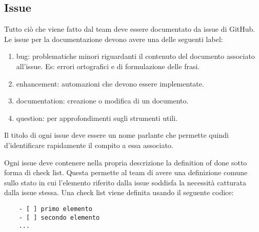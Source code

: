 \documentclass[a4paper, 12pt]{article}
\begin{document}
\subsection{Issue}
\label{subsec:issue}
Tutto ciò che viene fatto dal team deve essere documentato da issue di GitHub.
Le issue per la documentazione devono avere una delle seguenti label:
\begin{enumerate}
    \item bug: problematiche minori riguardanti il contenuto del documento associato all'issue.
    Es: errori ortografici e di formulazione delle frasi.

    \item enhancement: automazioni che devono essere implementate.
    
    \item documentation: creazione o modifica di un documento.
    
    \item question: per approfondimenti sugli strumenti utili.
\end{enumerate}

Il titolo di ogni issue deve essere un nome parlante che permette quindi d'identificare rapidamente il compito a essa associato.

Ogni issue deve contenere nella propria descrizione la definition of done sotto forma di check list.
Questa permette al team di avere una definizione comune sullo stato in cui l'elemento riferito dalla issue soddisfa la necessità catturata dalla issue stessa.
Una check list viene definita usando il seguente codice:
\begin{lstlisting}
    - [ ] primo elemento
    - [ ] secondo elemento
    ...
\end{lstlisting}
\end{document}
